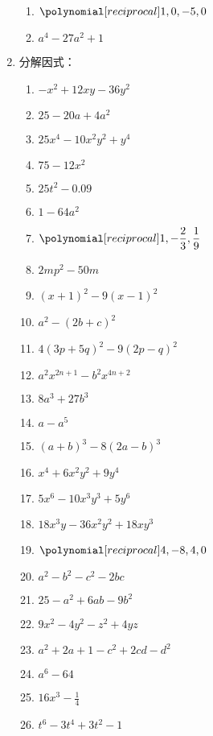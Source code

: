 \begin{enumerate}
\begin{multicols}{2}
\begin{enumerate}
        \item $\poly{1,0,-5,0}$
        \item $a^4-27a^2+1$
\end{enumerate}
\end{multicols}
    \item 分解因式：
    \begin{multicols}{2}
        \begin{enumerate}
        \item $-x^2+12xy-36y^2$
    \item $25-20a+4a^2$
    \item $25x^4-10x^2y^2+y^4$
    \item $75-12x^2$
    \item $25t^2-0.09$
    \item $1-64a^2$
    \item $\poly{1,-\frac{2}{3},\frac{1}{9}}$
    \item $2mp^2-50m$
    \item $(x+1)^2-9(x-1)^2$
    \item $a^2-(2b+c)^2$
    \item $4(3p+5q)^2-9(2p-q)^2$
    \item $a^2x^{2n+1}-b^2x^{4n+2}$
    \item $8a^3+27b^3$
    \item $a-a^5$
    \item $(a+b)^3-8(2a-b)^3$
    \item $x^4+6x^2y^2+9y^4$
    \item $5x^6-10x^3y^3+5y^6$
    \item $18x^3y-36x^2y^2+18xy^3$
    \item $\poly{4,-8,4,0}$
    \item $a^2-b^2-c^2-2bc$
    \item $25-a^2+6ab-9b^2$
    \item $9x^2-4y^2-z^2+4yz$
    \item $a^2+2a+1-c^2+2cd-d^2$
    \item $a^6-64$
    \item $16x^3-\frac{1}{4}$
    \item $t^6-3t^4+3t^2-1$
\end{enumerate}
    \end{multicols}
    

\end{enumerate}
